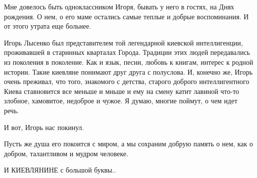 Мне довелось быть одноклассником Игоря, бывать у него в гостях, на Днях
рождения. О нем, о его маме остались самые теплые и добрые воспоминания. И от
этого утрата еще больнее.

Игорь Лысенко был представителем той легендарной киевской интеллигенции,
проживавшей в старинных кварталах Города. Традиции этих людей передавались из
поколения в поколение. Как и язык, песни, любовь к книгам, интерес к родной
истории. Такие киевляне понимают друг друга с полуслова. И, конечно же, Игорь
очень преживал, что того, знакомого с детства, старого доброго интеллигентного
Киева ставновится все меньше и мньше и ему на смену катит лавиной что-то
злобное, хамовитое, недоброе и чужое. Я думаю, многие поймут, о чем идет речь.

И вот, Игорь нас покинул.

Пусть же душа его покоится с миром, а мы сохраним добрую память о нем, как о
добром, талантливом и мудром человеке.

И КИЕВЛЯНИНЕ с большой буквы..

